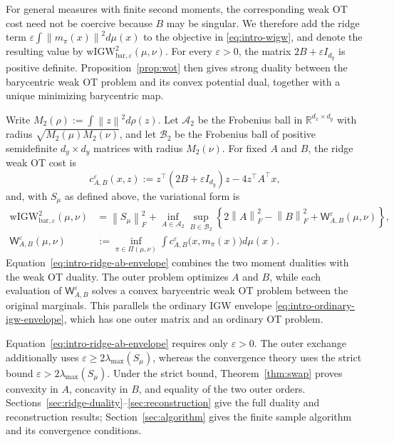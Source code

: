 \documentclass[11pt]{article}
\newcommand{\R}{\mathbb R}
\newcommand{\norm}[1]{\left\lVert #1\right\rVert}
\newcommand{\wIGWeps}{\mathrm{wIGW}_{\mathrm{bar},\varepsilon}}
\theoremstyle{plain}
\theoremstyle{definition}
\theoremstyle{remark}
\begin{document}
For general measures with finite second moments, the corresponding weak OT cost
need not be coercive because $B$ may be singular. We therefore add the ridge term
$\varepsilon\int\norm{m_\pi(x)}^2d\mu(x)$ to the objective in
\eqref{eq:intro-wigw}, and denote the resulting value by
$\wIGWeps^2(\mu,\nu)$. For every $\varepsilon>0$, the matrix
$2B+\varepsilon I_{d_y}$ is positive definite. Proposition~\ref{prop:wot} then
gives strong duality between the barycentric weak OT problem and its convex
potential dual, together with a unique minimizing barycentric map.

Write $M_2(\rho):=\int\norm z^2d\rho(z)$. Let $\mathcal A_2$ be the Frobenius
ball in $\R^{d_x\times d_y}$ with radius
$\sqrt{M_2(\mu)M_2(\nu)}$, and let $\mathcal B_2$ be the Frobenius ball of
positive semidefinite $d_y\times d_y$ matrices with radius $M_2(\nu)$.
For fixed $A$ and $B$, the ridge weak OT cost is
\[
 c_{A,B}^{\varepsilon}(x,z)
 :=z^\top(2B+\varepsilon I_{d_y})z-4z^\top A^\top x,
\]
and, with $S_\mu$ as defined above, the variational form is
\begin{equation}
\begin{aligned}
 \wIGWeps^2(\mu,\nu)
 &=\norm{S_\mu}_F^2+
   \inf_{A\in\mathcal A_2}\sup_{B\in\mathcal B_2}
   \left\{2\norm A_F^2-\norm B_F^2+
   \mathsf W_{A,B}^{\varepsilon}(\mu,\nu)\right\},\\
 \mathsf W_{A,B}^{\varepsilon}(\mu,\nu)
 &:=\inf_{\pi\in\Pi(\mu,\nu)}
   \int c_{A,B}^{\varepsilon}\bigl(x,m_\pi(x)\bigr)d\mu(x).
\end{aligned}
\end{equation}
Equation~\eqref{eq:intro-ridge-ab-envelope} combines the two moment dualities with
the weak OT duality. The outer problem optimizes $A$ and $B$, while each evaluation
of $\mathsf W_{A,B}^{\varepsilon}$ solves a convex barycentric weak OT problem
between the original marginals. This parallels the ordinary IGW envelope
\eqref{eq:intro-ordinary-igw-envelope}, which has one outer matrix and an ordinary
OT problem.

Equation~\eqref{eq:intro-ridge-ab-envelope} requires only $\varepsilon>0$. The
outer exchange additionally uses
$\varepsilon\ge2\lambda_{\max}(S_\mu)$, whereas the convergence theory uses the
strict bound $\varepsilon>2\lambda_{\max}(S_\mu)$. Under the strict bound,
Theorem~\ref{thm:swap} proves convexity in $A$, concavity in $B$, and equality of
the two outer orders. Sections~\ref{sec:ridge-duality}--\ref{sec:reconstruction}
give the full duality and reconstruction results; Section~\ref{sec:algorithm}
gives the finite sample algorithm and its convergence conditions.
\fi
\end{document}
